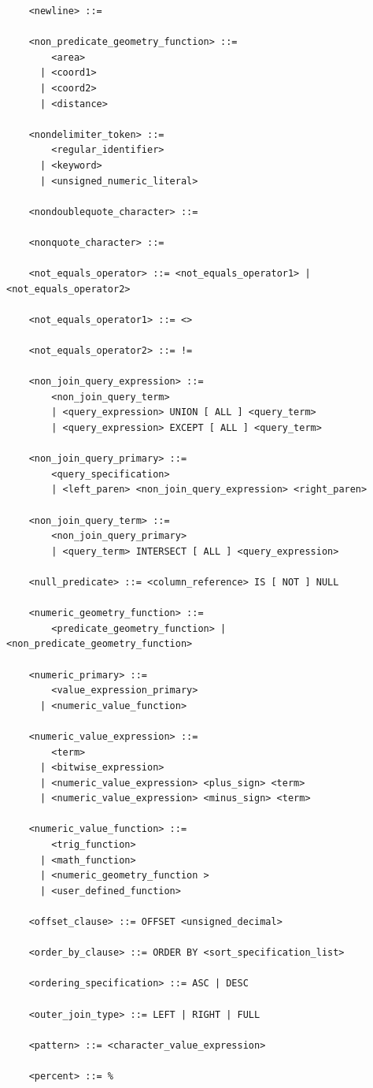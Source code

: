 \documentclass[11pt,a4paper]{ivoa}
\begin{document}
\begin{verbatim}
    <newline> ::=

    <non_predicate_geometry_function> ::=
        <area>
      | <coord1>
      | <coord2>
      | <distance>

    <nondelimiter_token> ::=
        <regular_identifier>
      | <keyword>
      | <unsigned_numeric_literal>

    <nondoublequote_character> ::=

    <nonquote_character> ::=

    <not_equals_operator> ::= <not_equals_operator1> | <not_equals_operator2>

    <not_equals_operator1> ::= <>

    <not_equals_operator2> ::= !=

    <non_join_query_expression> ::=
        <non_join_query_term>
        | <query_expression> UNION [ ALL ] <query_term>
        | <query_expression> EXCEPT [ ALL ] <query_term>

    <non_join_query_primary> ::=
        <query_specification>
        | <left_paren> <non_join_query_expression> <right_paren>

    <non_join_query_term> ::=
        <non_join_query_primary>
        | <query_term> INTERSECT [ ALL ] <query_expression>

    <null_predicate> ::= <column_reference> IS [ NOT ] NULL

    <numeric_geometry_function> ::=
        <predicate_geometry_function> | <non_predicate_geometry_function>

    <numeric_primary> ::=
        <value_expression_primary>
      | <numeric_value_function>

    <numeric_value_expression> ::=
        <term>
      | <bitwise_expression>
      | <numeric_value_expression> <plus_sign> <term>
      | <numeric_value_expression> <minus_sign> <term>

    <numeric_value_function> ::=
        <trig_function>
      | <math_function>
      | <numeric_geometry_function >
      | <user_defined_function>

    <offset_clause> ::= OFFSET <unsigned_decimal>

    <order_by_clause> ::= ORDER BY <sort_specification_list>

    <ordering_specification> ::= ASC | DESC

    <outer_join_type> ::= LEFT | RIGHT | FULL

    <pattern> ::= <character_value_expression>

    <percent> ::= %


\end{verbatim}
\end{document}

